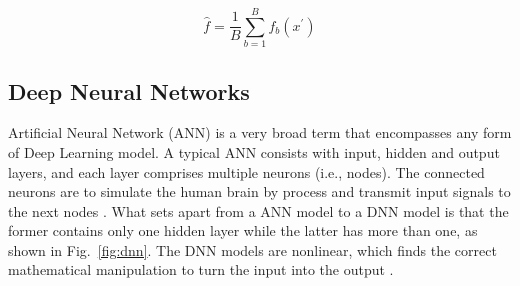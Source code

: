 \begin{equation}\label{eq-rf}
  \hat{f}=\frac{1}{B}\sum_{b=1}^{B}f_b(x^{'})
\end{equation}

\subsection{Deep Neural Networks}
Artificial Neural Network (ANN) is a very broad term that encompasses any form of Deep Learning model. A typical ANN consists with input, hidden and output layers, and each layer comprises multiple neurons (i.e., nodes). The connected neurons are to simulate the human brain by process and transmit input signals to the next nodes \citep{mohseni-dargahChapter12Machine2022} . What sets apart from a ANN model to a DNN model is that the former contains only one hidden layer while the latter has more than one, as shown in Fig.~\ref{fig:dnn}. The DNN models are nonlinear, which finds the correct mathematical manipulation to turn the input into the output \citep{bangaloreaiDeepNeuralNetwork2018}.

